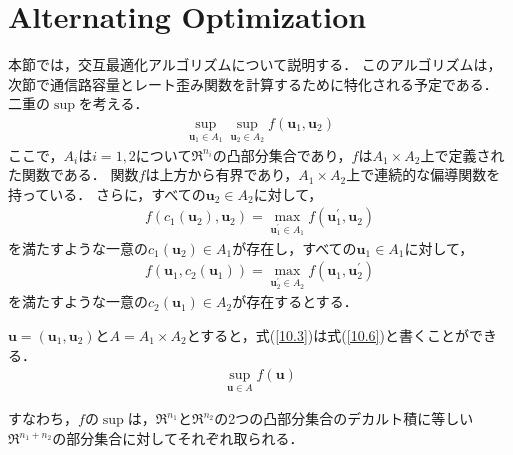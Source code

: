 \documentclass{ltjsarticle}
\begin{document}
\section{Alternating Optimization}
本節では，交互最適化アルゴリズムについて説明する．
このアルゴリズムは，次節で通信路容量とレート歪み関数を計算するために特化される予定である．
二重の$\sup$を考える．
\begin{eqnarray}
  \label{10.3}
  \sup_{\mathbf{u}_1 \in A_1} \sup_{\mathbf{u}_2 \in A_2} f(\mathbf{u}_1, \mathbf{u}_2)
\end{eqnarray}
ここで，$A_i$は$i = 1,2$について$\mathfrak{R}^{n_i}$の凸部分集合であり，$f$は$A_1 \times A_2$上で定義された関数である．
関数$f$は上方から有界であり，$A_1 \times A_2$上で連続的な偏導関数を持っている．
さらに，すべての$\mathbf{u}_2 \in A_2$に対して，
\begin{eqnarray}
  \label{10.4}
  f(c_1(\mathbf{u}_2), \mathbf{u}_2) = \max_{\mathbf{u}_1^{\prime} \in A_1} f(\mathbf{u}_1^{\prime}, \mathbf{u}_2)
\end{eqnarray}
を満たすような一意の$c_1 (\mathbf{u}_2) \in A_1$が存在し，すべての$\mathbf{u}_1 \in A_1$に対して，
\begin{eqnarray}
  \label{10.5}
  f(\mathbf{u}_1, c_2(\mathbf{u}_1)) = \max_{\mathbf{u}_2^{\prime} \in A_2} f(\mathbf{u}_1, \mathbf{u}_2^{\prime})
\end{eqnarray}
を満たすような一意の$c_2(\mathbf{u}_1) \in A_2$が存在するとする．

$\mathbf{u} = (\mathbf{u}_1, \mathbf{u}_2)$と$A = A_1 \times A_2$とすると，式(\ref{10.3})は式(\ref{10.6})と書くことができる．
\begin{eqnarray}
  \label{10.6}
  \sup_{\mathbf{u} \in A} f(\mathbf{u})
\end{eqnarray}

すなわち，$f$の$\sup$は，$\mathfrak{R}^{n_1}$と$\mathfrak{R}^{n_2}$の2つの凸部分集合のデカルト積に等しい$\mathfrak{R}^{n_1 + n_2}$の部分集合に対してそれぞれ取られる．
\end{document}
